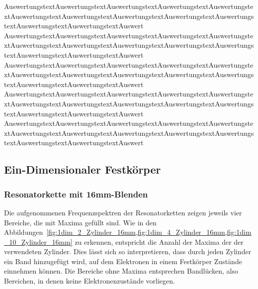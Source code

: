             AuswertungstextAuswertungstextAuswertungstextAuswertungstextAuswertungstextAuswertungstextAuswertungstextAuswertungstextAuswertungstextAuswertungstextAuswertungstextAuswertungstextAuswert
            AuswertungstextAuswertungstextAuswertungstextAuswertungstextAuswertungstextAuswertungstextAuswertungstextAuswertungstextAuswertungstextAuswertungstextAuswertungstextAuswertungstextAuswert
            AuswertungstextAuswertungstextAuswertungstextAuswertungstextAuswertungstextAuswertungstextAuswertungstextAuswertungstextAuswertungstextAuswertungstextAuswertungstextAuswertungstextAuswert
            AuswertungstextAuswertungstextAuswertungstextAuswertungstextAuswertungstextAuswertungstextAuswertungstextAuswertungstextAuswertungstextAuswertungstextAuswertungstextAuswertungstextAuswert
            AuswertungstextAuswertungstextAuswertungstextAuswertungstextAuswertungstextAuswertungstextAuswertungstextAuswertungstextAuswertungstextAuswertungstextAuswertungstextAuswertungstextAuswert

    \subsection{Ein-Dimensionaler Festkörper}
        \subsubsection*{Resonatorkette mit 16mm-Blenden}
            Die aufgenommenen Frequenzspektren der Resonatorketten zeigen jeweils vier Bereiche, die mit Maxima gefüllt sind. Wie in den 
            Abbildungen~\ref{fig:1dim_2_Zylinder_16mm,fig:1dim_4_Zylinder_16mm,fig:1dim_10_Zylinder_16mm} zu erkennen, entspricht die Anzahl der Maxima der der verwendeten Zylinder. Dies lässt sich so 
            interpretieren, dass durch jeden Zylinder ein Band hinzugefügt wird, auf dem Elektronen in einem Festkörper Zustände einnehmen können. Die Bereiche ohne Maxima entsprechen Bandlücken, also Bereichen,
            in denen keine Elektronenzustände vorliegen.     
            
